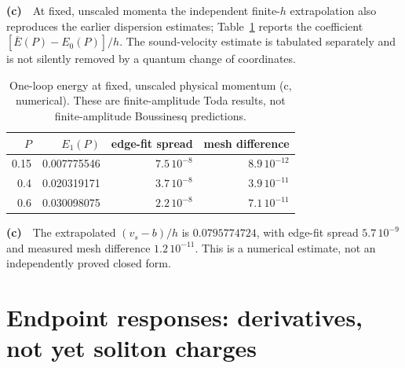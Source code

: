 \documentclass[11pt,a4paper]{article}
\newcommand{\Lc}{\textbf{(c)}\ }
\begin{document}
\Lc\ At fixed, unscaled momenta the independent finite-$h$ extrapolation
also reproduces the earlier dispersion estimates; Table~\ref{tab:fixed}
reports the coefficient $[\overline E(P)-E_0(P)]/h$.
The sound-velocity estimate is tabulated separately and is not silently
removed by a quantum change of coordinates.

\par
\begin{table}[ht]\centering\small
\begin{tabular}{rrrr}\toprule
$P$ & $E_1(P)$ & edge-fit spread & mesh difference\\\midrule
0.15 & 0.007775546 & $7.5\,10^{-8}$ & $8.9\,10^{-12}$\\
0.4 & 0.020319171 & $3.7\,10^{-8}$ & $3.9\,10^{-11}$\\
0.6 & 0.030098075 & $2.2\,10^{-8}$ & $7.1\,10^{-11}$\\
\bottomrule\end{tabular}
\caption{One-loop energy at fixed, unscaled physical momentum (c, numerical). These are finite-amplitude Toda results, not finite-amplitude Boussinesq predictions.}\label{tab:fixed}
\end{table}
\par

\Lc\ The extrapolated $(v_s-b)/h$ is $0.0795774724$, with edge-fit spread $5.7\,10^{-9}$ and measured mesh difference $1.2\,10^{-11}$. This is a numerical estimate, not an independently proved closed form.

\section{Endpoint responses: derivatives, not yet soliton charges}
\end{document}
